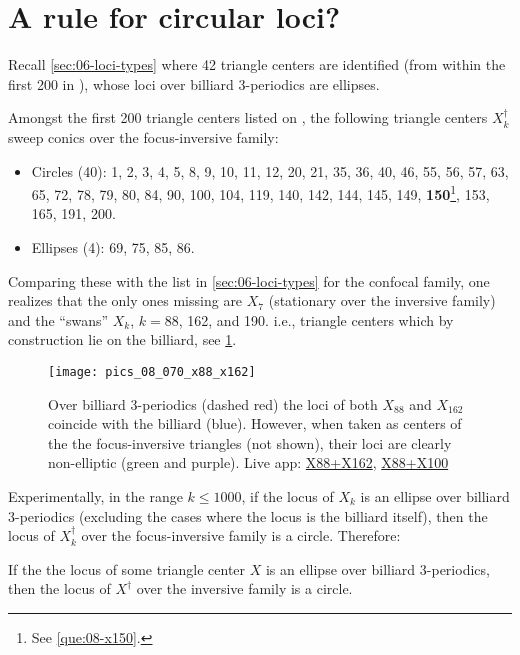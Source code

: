\section{A rule for circular loci?}

Recall \cref{sec:06-loci-types} where 42 triangle centers are identified (from within the first 200 in \cite{etc}), whose loci over billiard 3-periodics are ellipses.

\begin{observation}
Amongst the first 200 triangle centers listed on \cite{etc}, the following triangle centers $X_k^\dagger$ sweep conics over the focus-inversive family:

\begin{itemize}
\item Circles (40): 1, 2, 3, 4, 5, 8, 9, 10, 11, 12, 20, 21, 35, 36, 40, 46, 55, 56, 57, 63, 65, 72, 78,  79, 80, 84, 90, 100, 104, 119, 140, 142, 144, 145, 149, \textbf{150}\footnote{See \cref{que:08-x150}.}, 153, 165, 191, 200.
\item Ellipses (4): 69, 75, 85, 86.
\end{itemize}
\end{observation}

Comparing these with the list in \cref{sec:06-loci-types} for the confocal family, one realizes that the only ones missing are $X_7$ (stationary over the inversive family) and the ``swans'' $X_k$, $k=$88, 162, and 190. i.e., triangle centers which by construction lie on the billiard, see \cref{fig:08-x88-x162}.

\begin{figure}
    \centering
    \texttt{[image: pics\_08\_070\_x88\_x162]}
    \caption{Over billiard 3-periodics (dashed red) the loci of both $X_{88}$ and $X_{162}$  coincide with the billiard (blue). However, when taken as centers of the the focus-inversive triangles (not shown), their loci are clearly non-elliptic (green and purple). Live app: \href{https://bit.ly/32XfPyZ}{X88+X162}, \href{https://bit.ly/3lF3TsO}{X88+X100}}
    \label{fig:08-x88-x162}
\end{figure}

Experimentally, in the range $k{\leq}1000$, if the locus of $X_k$ is an ellipse over billiard 3-periodics (excluding the cases where the locus is the billiard itself), then the locus of $X_k^\dagger$ over the focus-inversive family is a circle. Therefore:

\begin{conjecture}
If the the locus of some triangle center $X$ is an ellipse over billiard 3-periodics, then the locus of $X^\dagger$ over the inversive family is a circle.
\end{conjecture}


